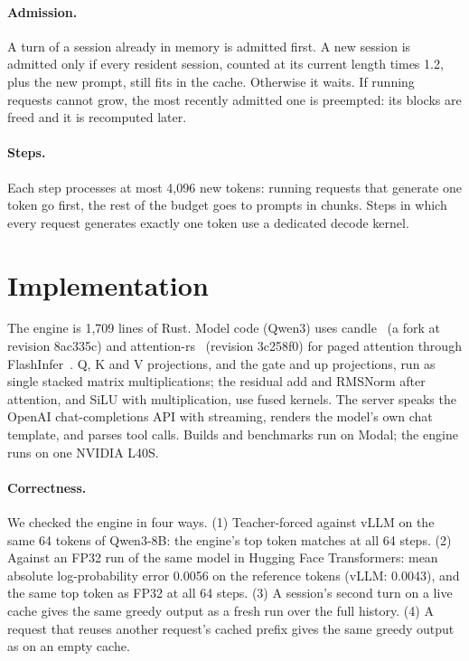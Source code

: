 \documentclass[11pt]{article}
\begin{document}
\paragraph{Admission.} A turn of a session already in memory is admitted first. A new session is admitted only if every resident session, counted at its current length times 1.2, plus the new prompt, still fits in the cache. Otherwise it waits. If running requests cannot grow, the most recently admitted one is preempted: its blocks are freed and it is recomputed later.

\paragraph{Steps.} Each step processes at most 4,096 new tokens: running requests that generate one token go first, the rest of the budget goes to prompts in chunks. Steps in which every request generates exactly one token use a dedicated decode kernel.

\section{Implementation}
\label{sec:impl}

The engine is 1,709 lines of Rust. Model code (Qwen3) uses candle~\cite{candle} (a fork at revision 8ac335c) and attention-rs~\cite{attentionrs} (revision 3c258f0) for paged attention through FlashInfer~\cite{flashinfer}. Q, K and V projections, and the gate and up projections, run as single stacked matrix multiplications; the residual add and RMSNorm after attention, and SiLU with multiplication, use fused kernels. The server speaks the OpenAI chat-completions API with streaming, renders the model's own chat template, and parses tool calls. Builds and benchmarks run on Modal; the engine runs on one NVIDIA L40S.

\paragraph{Correctness.} We checked the engine in four ways. (1) Teacher-forced against vLLM on the same 64 tokens of Qwen3-8B: the engine's top token matches at all 64 steps. (2) Against an FP32 run of the same model in Hugging Face Transformers: mean absolute log-probability error 0.0056 on the reference tokens (vLLM: 0.0043), and the same top token as FP32 at all 64 steps. (3) A session's second turn on a live cache gives the same greedy output as a fresh run over the full history. (4) A request that reuses another request's cached prefix gives the same greedy output as on an empty cache.
\end{document}
